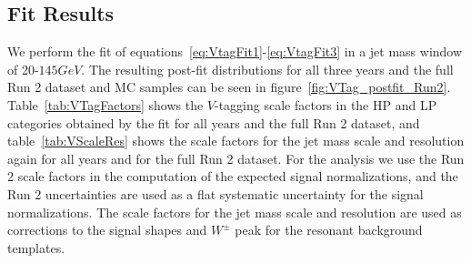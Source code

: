 \subsection{Fit Results}

We perform the fit of equations~\ref{eq:VtagFit1}-\ref{eq:VtagFit3} in a jet mass window of 20-$145\unit{GeV}$.
The resulting post-fit distributions for all three years and the full Run 2 dataset and MC samples can be seen in figure~\ref{fig:VTag_postfit_Run2}.
Table~\ref{tab:VTagFactors} shows the $V$-tagging scale factors in the HP and LP categories obtained by the fit for all years and the full Run 2 dataset, and table~\ref{tab:VScaleRes} shows the scale factors for the jet mass scale and resolution again for all years and for the full Run 2 dataset.
For the analysis we use the Run 2 scale factors in the computation of the expected signal normalizations, and the Run 2 uncertainties are used as a flat systematic uncertainty for the signal normalizations.
The scale factors for the jet mass scale and resolution are used as corrections to the signal shapes and $W^\pm$ peak for the resonant background templates.

